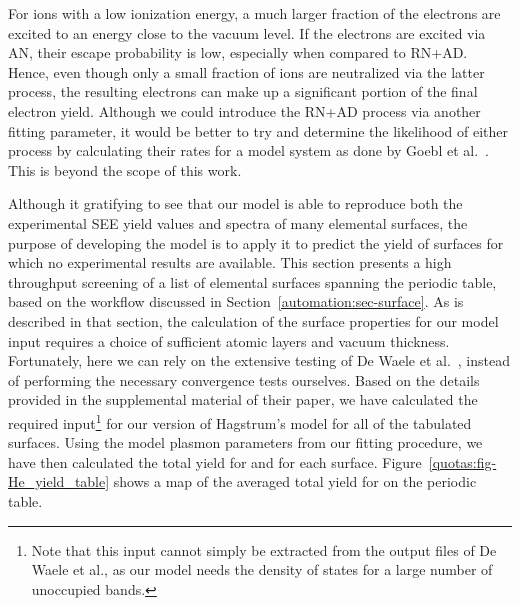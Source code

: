 \begin{refsection}
For ions with a low ionization energy, a much larger fraction of the electrons 
are excited to an energy close to the vacuum level. If the electrons are 
excited via AN, their escape probability is low, especially when compared to 
RN+AD. Hence, even though only a small fraction of ions are neutralized via 
the latter process, the resulting electrons can make up a significant portion 
of the final electron yield. Although we could introduce the RN+AD process via 
another fitting parameter, it would be better to try and determine the 
likelihood of either process by calculating their rates for a model system as 
done by Goebl et al.~\cite{Goebl2011}. This is beyond the scope of this work.


Although it gratifying to see that our model is able to reproduce both the 
experimental SEE yield values and spectra of many elemental surfaces, the 
purpose of developing the model is to apply it to predict the yield of 
surfaces for which no experimental results are available. This section
presents a high throughput screening of a list of elemental surfaces 
spanning the periodic table, based on the workflow discussed in 
Section~\ref{automation:sec-surface}. As is described in that section, the 
calculation of the surface properties for our model input requires a choice of 
sufficient atomic layers and vacuum thickness. Fortunately, here we can rely
on the extensive testing of De Waele et al.~\cite{DeWaele2016}, instead of 
performing the necessary convergence tests ourselves. Based on the details 
provided in the supplemental material of their paper, we have calculated 
the required input\footnote{Note that this input cannot simply be extracted
from the output files of De Waele et al., as our model needs the density of 
states for a large number of unoccupied bands.} for our version of Hagstrum's 
model for all of the tabulated surfaces.
Using the model plasmon parameters from our fitting 
procedure, we have then calculated the total yield for  and 
for each surface. Figure~\ref{quotas:fig-He_yield_table} shows a map of the 
averaged total yield for  on the periodic table.  
 

\end{refsection}
